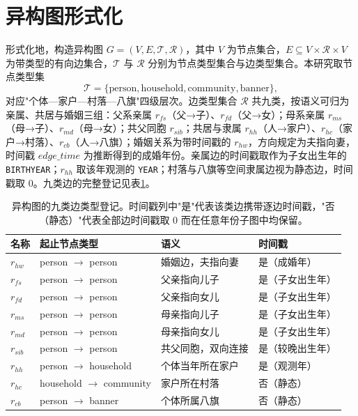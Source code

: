 \section{异构图形式化}\label{sec:graph-formal}

形式化地，构造异构图 \(G=(V,E,\mathcal{T},\mathcal{R})\)，其中 \(V\) 为节点集合，\(E\subseteq V\times\mathcal{R}\times V\) 为带类型的有向边集合，\(\mathcal{T}\) 与 \(\mathcal{R}\) 分别为节点类型集合与边类型集合\citep{hu2020hgt}。本研究取节点类型集
\[
\mathcal{T}=\{\text{person},\text{household},\text{community},\text{banner}\},
\]
对应"个体—家户—村落—八旗"四级层次。边类型集合 \(\mathcal{R}\) 共九类，按语义可归为亲属、共居与婚姻三组：父系亲属 \(r_{fs}\)（父→子）、\(r_{fd}\)（父→女）；母系亲属 \(r_{ms}\)（母→子）、\(r_{md}\)（母→女）；共父同胞 \(r_{sib}\)；共居与隶属 \(r_{hh}\)（人→家户）、\(r_{hc}\)（家户→村落）、\(r_{cb}\)（人→八旗）；婚姻关系为带时间戳的 \(r_{hw}\)，方向规定为夫指向妻，时间戳 \(\mathit{edge\_time}\) 为推断得到的成婚年份。亲属边的时间戳取作为子女出生年的 \texttt{BIRTHYEAR}；\(r_{hh}\) 取该年观测的 \texttt{YEAR}；村落与八旗等空间隶属边视为静态边，时间戳取 0。九类边的完整登记见表\ref{tab:edge-types}。

\begin{table}[h]
\centering
\caption{异构图的九类边类型登记。时间戳列中"是"代表该类边携带逐边时间戳，"否（静态）"代表全部边时间戳取 0 而在任意年份子图中均保留。}
\label{tab:edge-types}
\begin{tabular}{llll}
\hline
名称 & 起止节点类型 & 语义 & 时间戳 \\
\hline
$r_{hw}$ & person $\to$ person & 婚姻边，夫指向妻 & 是（成婚年） \\
$r_{fs}$ & person $\to$ person & 父亲指向儿子 & 是（子女出生年） \\
$r_{fd}$ & person $\to$ person & 父亲指向女儿 & 是（子女出生年） \\
$r_{ms}$ & person $\to$ person & 母亲指向儿子 & 是（子女出生年） \\
$r_{md}$ & person $\to$ person & 母亲指向女儿 & 是（子女出生年） \\
$r_{sib}$ & person $\to$ person & 共父同胞，双向连接 & 是（较晚出生年） \\
$r_{hh}$ & person $\to$ household & 个体当年所在家户 & 是（观测年） \\
$r_{hc}$ & household $\to$ community & 家户所在村落 & 否（静态） \\
$r_{cb}$ & person $\to$ banner & 个体所属八旗 & 否（静态） \\
\hline
\end{tabular}
\end{table}

